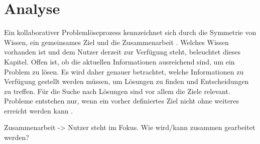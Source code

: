 
\chapter{Analyse}
\label{sec:Anforderungsanalyse}
Ein kollaborativer Problemlöseprozess kennzeichnet sich durch die Symmetrie von Wissen, ein gemeinsames Ziel und die Zusammenarbeit \cite{Rummel1958}. Welches Wissen vorhanden ist und dem Nutzer derzeit zur Verfügung steht, beleuchtet dieses Kapitel. Offen ist, ob die aktuellen Informationen ausreichend sind, um ein Problem zu lösen. Es wird daher genauer betrachtet, welche Informationen zu Verfügung gestellt werden müssen, um Lösungen zu finden und Entscheidungen zu treffen. Für die Suche nach Lösungen sind vor allem die Ziele relevant. Probleme entstehen nur, wenn ein vorher definiertes Ziel nicht ohne weiteres erreicht werden kann . 

Zusammenarbeit -> Nutzer steht im Fokus. Wie wird/kann zusammen gearbeitet werden?



